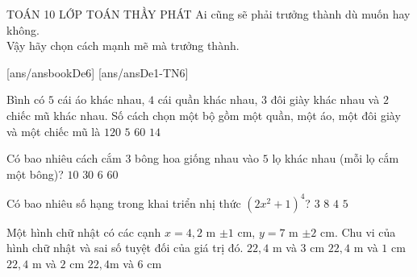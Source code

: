 \begin{name}
	{\tenchude}
	{TOÁN 10}
	{LỚP TOÁN THẦY PHÁT}
	{{Ai cũng sẽ phải trưởng thành dù muốn hay không.\\ Vậy hãy chọn cách mạnh mẽ mà trưởng thành.}}
\end{name}
[ans/ansbookDe6]
\TN
{}[ans/ansDe1-TN6]
\begin{ex}%
Bình có $5$ cái áo khác nhau, $4$ cái quần khác nhau, $3$ đôi giày khác nhau và $2$ chiếc mũ khác nhau. Số cách chọn một bộ gồm một quần, một áo, một đôi giày và một chiếc mũ là
\choice
{\True $120$}
{$5$}
{$60$}
{$14$}
\end{ex}

\begin{ex}%
Có bao nhiêu cách cắm $ 3 $ bông hoa giống nhau vào $ 5 $ lọ khác nhau (mỗi lọ cắm  một bông)?
\choice
{\True $ 10 $}
{$ 30 $}
{$ 6 $}
{$ 60 $}
\end{ex}

\begin{ex}%
Có bao nhiêu số hạng trong khai triển nhị thức $\left(2 x^2+1\right)^4$?
\choice
{$3$}
{$8$}
{$4$}
{\True $5$}
\end{ex}

\begin{ex}%
Một hình chữ nhật có các cạnh $x = 4{,}2$ m $\pm 1$ cm, $y = 7$ m $\pm 2$ cm. Chu vi của hình chữ nhật và sai số tuyệt đối của giá trị đó.
\choice
{$22{,}4$ m và $3$ cm}
{$22{,}4$ m và $1$ cm}
{$22{,}4$ m và $2$ cm}
{\True $22{,}4$m và $6$ cm}
\end{ex}

